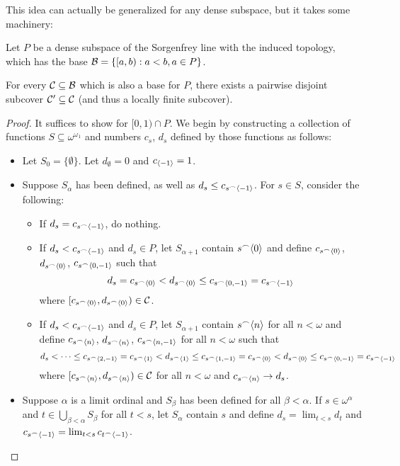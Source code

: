 This idea can actually be generalized for any dense subspace, but it takes some machinery:

\begin{theorem}
Let $P$ be a dense subspace of the Sorgenfrey line with the induced topology, which has the base $\mathcal{B} = \{[a,b) : a<b, a\in P\}$.

For every $\mathcal{C}\subseteq\mathcal{B}$ which is also a base for $P$, there exists a pairwise disjoint subcover $\mathcal{C}'\subseteq\mathcal{C}$ (and thus a locally finite subcover).
\end{theorem}
\newpage
\begin{proof}
It suffices to show for $[0,1)\cap P$. We begin by constructing a collection of functions $S\subseteq \omega^{\omega_1}$ and numbers $c_s$, $d_s$ defined by those functions as follows:
  \begin{itemize}
    \item Let $S_0 = \{\emptyset\}$. Let $d_{\emptyset}=0$ and $c_{\langle-1\rangle}=1$.
    \item Suppose $S_\alpha$ has been defined, as well as $d_s\leq c_{s^\frown\langle-1\rangle}$. For $s\in S$, consider the following:
      \begin{itemize}
        \item If $d_s = c_{s^\frown\langle-1\rangle}$, do nothing.
        \item If $d_s < c_{s^\frown\langle-1\rangle}$ and $d_s\in P$, let $S_{\alpha+1}$ contain $s^\frown\langle0\rangle$ and define $c_{s^\frown\langle0\rangle}$, $d_{s^\frown\langle0\rangle}$, $c_{s^\frown\langle0,-1\rangle}$ such that 
          \[
            d_s = c_{s^\frown\langle0\rangle} < d_{s^\frown\langle0\rangle} \leq c_{s^\frown\langle0,-1\rangle} = c_{s^\frown\langle-1\rangle}
          \]
        where $[c_{s^\frown\langle0\rangle}, d_{s^\frown\langle0\rangle})\in \mathcal{C}$.
        \item If $d_s < c_{s^\frown\langle-1\rangle}$ and $d_s\in P$, let $S_{\alpha+1}$ contain $s^\frown\langle n\rangle$ for all $n<\omega$ and define $c_{s^\frown\langle n\rangle}$, $d_{s^\frown\langle n\rangle}$, $c_{s^\frown\langle n,-1\rangle}$ for all $n<\omega$ such that
          \[
            d_s < \dots \leq c_{s^\frown\langle2,-1\rangle} = c_{s^\frown\langle1\rangle} < d_{s^\frown\langle1\rangle} \leq c_{s^\frown\langle1,-1\rangle} = c_{s^\frown\langle0\rangle} < d_{s^\frown\langle0\rangle} \leq c_{s^\frown\langle0,-1\rangle} = c_{s^\frown\langle-1\rangle}
          \]
        where $[c_{s^\frown\langle n\rangle}, d_{s^\frown\langle n\rangle})\in \mathcal{C}$ for all $n<\omega$ and $c_{s^\frown\langle n\rangle} \rightarrow d_s$.
      \end{itemize}
    \item Suppose $\alpha$ is a limit ordinal and $S_\beta$ has been defined for all $\beta<\alpha$. If $s\in\omega^\alpha$ and $t\in \bigcup_{\beta<\alpha}S_\beta$ for all $t<s$, let $S_\alpha$ contain $s$ and define $d_s = \lim_{t<s}d_t$ and $c_{s^\frown\langle-1\rangle} = \lim_{t<s} c_{t^\frown\langle-1\rangle}$.
  \end{itemize}


\end{proof}
